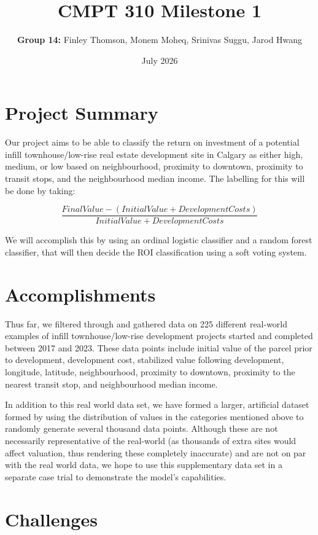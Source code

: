 \documentclass{article}
\title{CMPT 310 Milestone 1}
\author{\textbf{Group 14:} Finley Thomson, Monem Moheq, Srinivas Suggu, Jarod Hwang}
\date{July 2026}
\begin{document}
\maketitle

\section*{Project Summary}

\quad Our project aims to be able to classify the return on investment of a potential infill townhouse/low-rise real estate development site in Calgary as either high, medium, or low based on neighbourhood, proximity to downtown, proximity to transit stops, and the neighbourhood median income. The labelling for this will be done by taking:

\begin{equation}
    \frac{FinalValue - (InitialValue + Development Costs)}{InitialValue + Development Costs}
\end{equation}
    
We will accomplish this by using an ordinal logistic classifier and a random forest classifier, that will then decide the ROI classification using a soft voting system.

\section*{Accomplishments}

\quad Thus far, we filtered through and gathered data on 225 different real-world examples of infill townhouse/low-rise development projects started and completed between 2017 and 2023. These data points include initial value of the parcel prior to development, development cost, stabilized value following development, longitude, latitude, neighbourhood, proximity to downtown, proximity to the nearest transit stop, and neighbourhood median income. 

In addition to this real world data set, we have formed a larger, artificial dataset formed by using the distribution of values in the categories mentioned above to randomly generate several thousand data points. Although these are not necessarily representative of the real-world (as thousands of extra sites would affect valuation, thus rendering these completely inaccurate) and are not on par with the real world data, we hope to use this supplementary data set in a separate case trial to demonstrate the model's capabilities. 


\section*{Challenges}
\end{document}
